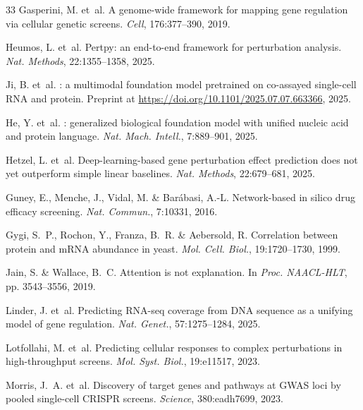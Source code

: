 \documentclass{article}
\begin{document}
\begin{thebibliography}{33}
Gasperini, M. et~al.
\newblock A genome-wide framework for mapping gene regulation via cellular genetic screens.
\newblock \emph{Cell}, 176:377--390, 2019.

Heumos, L. et~al.
\newblock Pertpy: an end-to-end framework for perturbation analysis.
\newblock \emph{Nat. Methods}, 22:1355--1358, 2025.

Ji, B. et~al.
: a multimodal foundation model pretrained on co-assayed single-cell {RNA} and protein.
\newblock Preprint at \url{https://doi.org/10.1101/2025.07.07.663366}, 2025.

He, Y. et~al.
: generalized biological foundation model with unified nucleic acid and protein language.
\newblock \emph{Nat. Mach. Intell.}, 7:889--901, 2025.

Hetzel, L. et~al.
\newblock Deep-learning-based gene perturbation effect prediction does not yet outperform simple linear baselines.
\newblock \emph{Nat. Methods}, 22:679--681, 2025.

Guney, E., Menche, J., Vidal, M. \& Bar\'{a}basi, A.-L.
\newblock Network-based in silico drug efficacy screening.
\newblock \emph{Nat. Commun.}, 7:10331, 2016.

Gygi, S.~P., Rochon, Y., Franza, B.~R. \& Aebersold, R.
\newblock Correlation between protein and {mRNA} abundance in yeast.
\newblock \emph{Mol. Cell. Biol.}, 19:1720--1730, 1999.

Jain, S. \& Wallace, B.~C.
\newblock Attention is not explanation.
\newblock In \emph{Proc. NAACL-HLT}, pp. 3543--3556, 2019.

Linder, J. et~al.
\newblock Predicting {RNA}-seq coverage from {DNA} sequence as a unifying model of gene regulation.
\newblock \emph{Nat. Genet.}, 57:1275--1284, 2025.

Lotfollahi, M. et~al.
\newblock Predicting cellular responses to complex perturbations in high-throughput screens.
\newblock \emph{Mol. Syst. Biol.}, 19:e11517, 2023.

Morris, J.~A. et~al.
\newblock Discovery of target genes and pathways at {GWAS} loci by pooled single-cell {CRISPR} screens.
\newblock \emph{Science}, 380:eadh7699, 2023.


\end{thebibliography}
\end{document}
